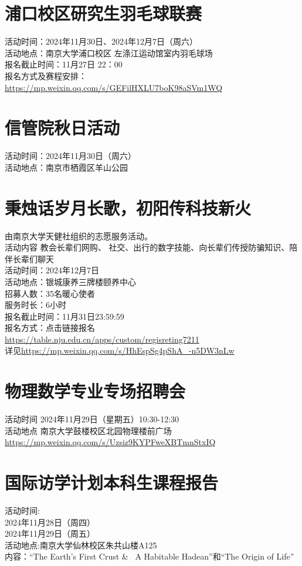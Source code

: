 \documentclass[letterpaper, 12pt]{article}
\begin{document}
\begin{multicols}{2}
\section{浦口校区研究生羽毛球联赛}
活动时间：2024年11月30日、2024年12月7日（周六）\\
活动地点：南京大学浦口校区 左涤江运动馆室内羽毛球场\\
报名截止时间：11月27日 22：00\\
报名方式及赛程安排：\url{https://mp.weixin.qq.com/s/GEFilHXLU7boK98aSVm1WQ}\\

\section{信管院秋日活动}
活动时间：2024年11月30日（周六）\\
活动地点：南京市栖霞区羊山公园\\

\section{秉烛话岁月长歌，初阳传科技新火}
由南京大学天健社组织的志愿服务活动。\\
活动内容 教会长辈们网购、 社交、出行的数字技能、向长辈们传授防骗知识、陪伴长辈们聊天\\
活动时间：2024年12月7日\\
活动地点：银城康养三牌楼颐养中心\\
招募人数：35名暖心使者\\
服务时长：6小时\\
报名截止时间：11月31日23:59:59\\
报名方式：点击链接报名 \\
\url{https://table.nju.edu.cn/apps/custom/regisreting7211}\\
详见\url{https://mp.weixin.qq.com/s/HhEspSg4pShA_-n5DW3nLw}

\section{物理数学专业专场招聘会}
活动时间 2024年11月29日（星期五）10:30-12:30\\
活动地点 南京大学鼓楼校区北园物理楼前广场\\
\url{https://mp.weixin.qq.com/s/Uzsiz9KYPFweXBTmnStxIQ}\\

\section{国际访学计划本科生课程报告}
活动时间:\\
2024年11月28日（周四）\\
2024年11月29日（周五）\\
活动地点:南京大学仙林校区朱共山楼A125\\
内容：“The Earth's First Crust &  A Habitable Hadean”和“The Origin of Life”\\

\end{multicols}
\end{document}
